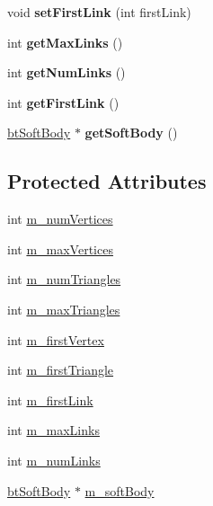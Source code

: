 \begin{DoxyCompactItemize}
void {\bfseries set\+First\+Link} (int first\+Link)
\item 
\mbox{\label{classbtOpenCLAcceleratedSoftBodyInterface_a27dfff0473554901ecf06f12bd9039e4}} 
int {\bfseries get\+Max\+Links} ()
\item 
\mbox{\label{classbtOpenCLAcceleratedSoftBodyInterface_a0d84887f62ccdccebbbedb2e5cdaceeb}} 
int {\bfseries get\+Num\+Links} ()
\item 
\mbox{\label{classbtOpenCLAcceleratedSoftBodyInterface_a0fbef20e44f5428f9ba489b7a3094bce}} 
int {\bfseries get\+First\+Link} ()
\item 
\mbox{\label{classbtOpenCLAcceleratedSoftBodyInterface_ae3d88843eb2bed78d651e0f5299d01a6}} 
\hyperlink{classbtSoftBody}{bt\+Soft\+Body} $\ast$ {\bfseries get\+Soft\+Body} ()
\end{DoxyCompactItemize}
\subsection*{Protected Attributes}
\begin{DoxyCompactItemize}
\item 
int \hyperlink{classbtOpenCLAcceleratedSoftBodyInterface_a7066f48b63d0a783e0527eb66489aae3}{m\+\_\+num\+Vertices}
\item 
int \hyperlink{classbtOpenCLAcceleratedSoftBodyInterface_a22315dd7b0bb4cb93f54c9a5fc8e8bd4}{m\+\_\+max\+Vertices}
\item 
int \hyperlink{classbtOpenCLAcceleratedSoftBodyInterface_a294ea06835204cca54467b44312940fd}{m\+\_\+num\+Triangles}
\item 
int \hyperlink{classbtOpenCLAcceleratedSoftBodyInterface_aef48706f7d1d803817a12c2594956420}{m\+\_\+max\+Triangles}
\item 
int \hyperlink{classbtOpenCLAcceleratedSoftBodyInterface_a01a8a8cb234b7f0b1b629a6d03f5f0c7}{m\+\_\+first\+Vertex}
\item 
int \hyperlink{classbtOpenCLAcceleratedSoftBodyInterface_abc2c9ff04bfe0d0a9578e53ba736c309}{m\+\_\+first\+Triangle}
\item 
int \hyperlink{classbtOpenCLAcceleratedSoftBodyInterface_a690606a7caf85dcbf3c20d67026fc4ed}{m\+\_\+first\+Link}
\item 
int \hyperlink{classbtOpenCLAcceleratedSoftBodyInterface_a52e623365139c2d6b2833acb77415804}{m\+\_\+max\+Links}
\item 
int \hyperlink{classbtOpenCLAcceleratedSoftBodyInterface_a34f2f02626d058ee305fe5f66b3ee0a2}{m\+\_\+num\+Links}
\item 
\hyperlink{classbtSoftBody}{bt\+Soft\+Body} $\ast$ \hyperlink{classbtOpenCLAcceleratedSoftBodyInterface_a7454a985f23bd3957611a8bebb2ad4a8}{m\+\_\+soft\+Body}
\end{DoxyCompactItemize}


